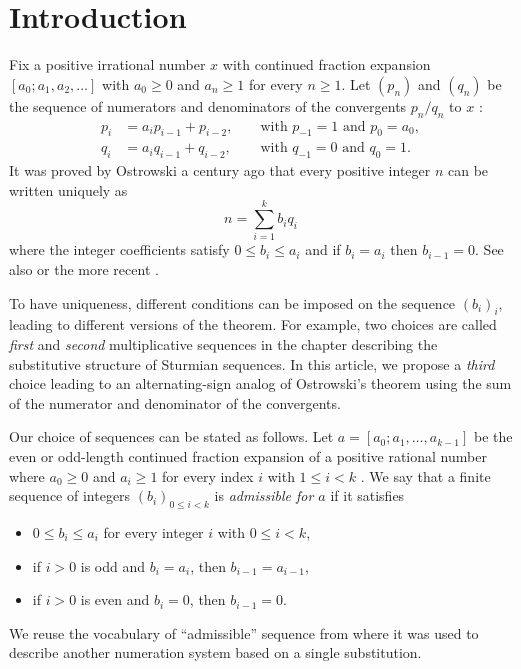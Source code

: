 \documentclass[a4paper,12pt]{amsart}
\newcommand{\xx}{{x}}
\newcommand{\0}{\mathtt{0}}
\newcommand{\1}{\mathtt{1}}
\newcommand{\2}{\mathtt{2}}
\newcommand{\3}{\mathtt{3}}
\begin{document}
\setcounter{tocdepth}{1}
\tableofcontents




\section{Introduction}

Fix a positive irrational number $\xx$ with continued fraction expansion
$[a_0; a_1, a_2, \dots]$ with $a_0\geq0$ and $a_n\geq1$ for every $n\geq1$.
Let $(p_n)$ and $(q_n)$ be the sequence of numerators and denominators of the
convergents $p_n/q_n$ to $\xx$ \cite[Theorem 149]{MR2445243}:
\begin{equation}\label{eq:CF-denominators}
\begin{aligned}
    p_i &= a_ip_{i-1} + p_{i-2},  &&\text{ with } p_{-1}=1 \text{ and } p_0=a_0,\\
    q_i &= a_iq_{i-1} + q_{i-2},  &&\text{ with } q_{-1}=0 \text{ and } q_0=1.
\end{aligned}
\end{equation}
It was proved by Ostrowski a century ago \cite{zbMATH02600866}
that every positive integer $n$ can be written uniquely as
\[
    n = \sum_{i=1}^{k}b_{i}q_{i}
\]
where the integer coefficients satisfy $0 \leq b_i \leq a_i$ and if $b_i = a_i$
then $b_{i-1} = 0$.
See also \cite{berthe_autour_2001,MR1997038, MR1970391, MR1970385} or the more recent
\cite{epifanio_sturmian_2012}.

To have uniqueness, different conditions can be imposed on the sequence $(b_i)_i$,
leading to different versions of the theorem. For example, two choices are
called \emph{first} and \emph{second} multiplicative sequences in the chapter
\cite{MR1970391} describing the substitutive structure of Sturmian sequences.
In this article, we propose a \emph{third} choice
leading to an alternating-sign analog of Ostrowski's theorem
using the sum of the numerator and denominator of the convergents.

Our choice of sequences can be stated as follows.
Let $a=[a_0; a_1, \dots, a_{k-1}]$
be the even or odd-length continued fraction expansion
of a positive rational number
where $a_0\geq0$ and $a_i\geq1$ for every index $i$ with $1\leq i<k$
\cite[Theorem 162]{MR2445243}.
%
    We say that a finite sequence of integers $(b_i)_{0\leq i< k}$ is
    \emph{admissible for $a$} if it satisfies
    \begin{itemize}
        \item $0 \leq b_i \leq a_i$ for every integer $i$ with $0\leq i<k$,
        \item if $i>0$ is odd and $b_i = a_i$, then $b_{i-1} = a_{i-1}$,
        \item if $i>0$ is even  and $b_i = 0$, then $b_{i-1} = 0$.
    \end{itemize}
%
    We reuse the vocabulary of ``admissible'' sequence from \cite{MR1020484,MR4836876}
    where it was used to describe another numeration system based on a single substitution.
\end{document}
